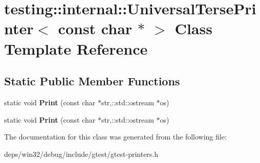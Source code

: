 \hypertarget{classtesting_1_1internal_1_1_universal_terse_printer_3_01const_01char_01_5_01_4}{}\section{testing\+:\+:internal\+:\+:Universal\+Terse\+Printer$<$ const char $\ast$ $>$ Class Template Reference}
\label{classtesting_1_1internal_1_1_universal_terse_printer_3_01const_01char_01_5_01_4}
\subsection*{Static Public Member Functions}
\begin{DoxyCompactItemize}
\item 
\hypertarget{classtesting_1_1internal_1_1_universal_terse_printer_3_01const_01char_01_5_01_4_aa7bc28677539f2f151e8fbcd9c573655}{}static void {\bfseries Print} (const char $\ast$str,\+::std\+::ostream $\ast$os)\label{classtesting_1_1internal_1_1_universal_terse_printer_3_01const_01char_01_5_01_4_aa7bc28677539f2f151e8fbcd9c573655}

\item 
\hypertarget{classtesting_1_1internal_1_1_universal_terse_printer_3_01const_01char_01_5_01_4_aa7bc28677539f2f151e8fbcd9c573655}{}static void {\bfseries Print} (const char $\ast$str,\+::std\+::ostream $\ast$os)\label{classtesting_1_1internal_1_1_universal_terse_printer_3_01const_01char_01_5_01_4_aa7bc28677539f2f151e8fbcd9c573655}

\end{DoxyCompactItemize}


The documentation for this class was generated from the following file\+:\begin{DoxyCompactItemize}
\item 
deps/win32/debug/include/gtest/gtest-\/printers.\+h\end{DoxyCompactItemize}
